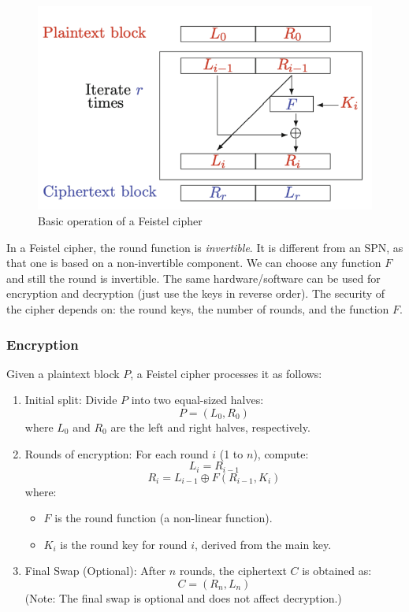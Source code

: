 \begin{figure}[h!]
\begin{minipage}[t]{0.35\textwidth}
        \label{fig:spn}
    \end{minipage}
    \hfill
    \begin{minipage}[t]{0.45\textwidth}
        \vspace{0pt} %
        \includegraphics[width=\textwidth]{img/feistel.png}
        \caption{Basic operation of a Feistel cipher}
    \end{minipage}
\end{figure}

In a Feistel cipher, the round function is \emph{invertible}. It is different from an SPN, as that one is based on a non-invertible component. We can choose any function $F$ and still the round is invertible.
The same hardware/software can be used for encryption and decryption (just use the keys in reverse order). The security of the cipher depends on: the round keys, the number of rounds, and the function $F$.

\subsubsection{Encryption}
Given a plaintext block \( P \), a Feistel cipher processes it as follows:

\begin{enumerate}
    \item Initial split: Divide \( P \) into two equal-sized halves:
    \[
    P = (L_0, R_0)
    \]
    where \( L_0 \) and \( R_0 \) are the left and right halves, respectively.

    \item Rounds of encryption: For each round \( i \) (1 to \( n \)), compute:
    \[
    L_i = R_{i-1}
    \]
    \[
    R_i = L_{i-1} \oplus F(R_{i-1}, K_i)
    \]
    where:
    \begin{itemize}
        \item \( F \) is the round function (a non-linear function).
        \item \( K_i \) is the round key for round \( i \), derived from the main key.
    \end{itemize}

    \item Final Swap (Optional): After \( n \) rounds, the ciphertext \( C \) is obtained as:
    \[
    C = (R_n, L_n)
    \]
    (Note: The final swap is optional and does not affect decryption.)
\end{enumerate}

